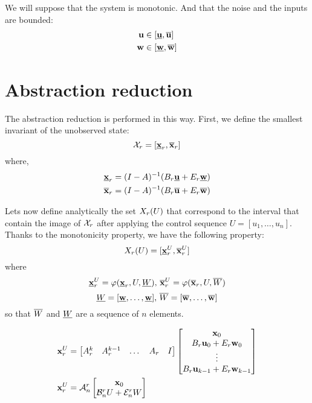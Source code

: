 \documentclass{article}
\begin{document}
We will suppose that the system is monotonic. 
And that the noise and the inputs are bounded:
\begin{equation}
\begin{aligned}
\mathbf{u} &\in [\underline{\mathbf{u}},\overline{\mathbf{u}}]\\
\mathbf{w} &\in [\underline{\mathbf{w}},\overline{\mathbf{w}}]\\
\end{aligned}
\end{equation}

\section{Abstraction reduction}

The abstraction reduction is performed in this way. First, we define the smallest invariant of the unobserved state:
$$
\mathcal{X}_r = [\underline{\mathbf{x}}_r,\overline{\mathbf{x}}_r]
$$
where,
$$
\begin{aligned}
\underline{\mathbf{x}}_r &= (I-A)^{-1} (B_r \underline{\mathbf{u}} + E_r \underline{\mathbf{w}})\\
\overline{\mathbf{x}}_r &= (I-A)^{-1} (B_r \overline{\mathbf{u}} + E_r \overline{\mathbf{w}})
\end{aligned}
$$

Lets now define analytically the set $X_r(U)$ that correspond to the interval that contain the image of $\mathcal{X}_r$ after applying the control sequence $U = [u_1,\dots,u_n]$.
Thanks to the monotonicity property, we have the following property:
\newcommand{\xui}{\minf{\x}^U_r}
\newcommand{\xus}{\msup{\x}^U_r}
\newcommand{\xu}{\x^U_r}
$$\Xr(U) = [\xui,\xus]$$
where
$$\xui = \traj (\xrinf,U,\Winf)
\textrm{, }
\xus = \traj (\xrsup,U,\Wsup)$$
$$ \underline{W} = [\underline{\mathbf{w}},\dots,\underline{\mathbf{w}}]
\textrm{, }
\overline{W} = [\overline{\mathbf{w}},\dots,\overline{\mathbf{w}}]$$
so that $\overline{W}$ and $\underline{W}$ are a sequence of $n$ elements.


\newcommand{\An}{\mathcal{A}^r_n}
\newcommand{\Bn}{\mathcal{B}^r_n}
\newcommand{\En}{\mathcal{E}^r_n}
\begin{align}
\xu &=
\begin{bmatrix}
A_r^k & A_r^{k-1} &\dots & A_r & I
\end{bmatrix}
\begin{bmatrix}
\x_0 \\
B_r \u_0 + E_r \w_0\\
\vdots \\
B_r \u_{k-1} + E_r \w_{k-1}\\
\end{bmatrix}\\
\xu &=
\An
\begin{bmatrix}
\x_0 \\
\Bn U + \En W
\end{bmatrix}
\end{align}
\end{document}
